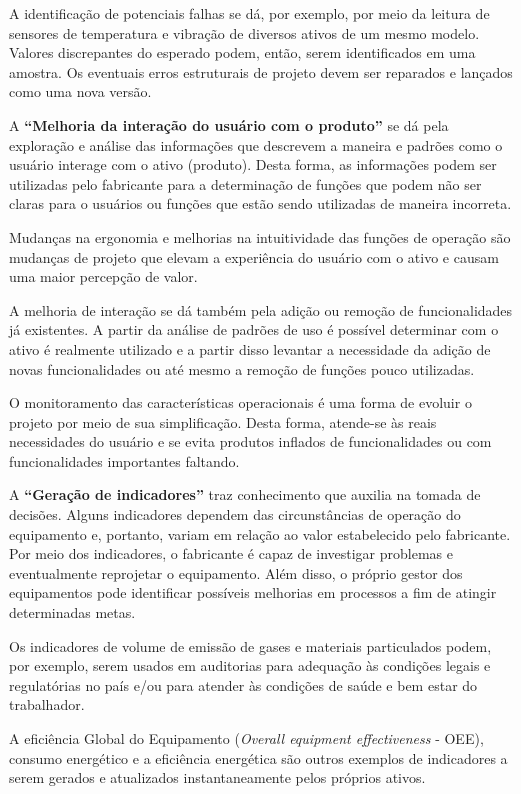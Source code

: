 A identificação de potenciais falhas se dá, por exemplo, por meio da leitura de sensores de temperatura e vibração de diversos ativos de um mesmo modelo. Valores discrepantes do esperado podem, então, serem identificados em uma amostra. Os eventuais erros estruturais de projeto devem ser reparados e lançados como uma nova versão.

A \textbf{``Melhoria da interação do usuário com o produto''} se dá pela exploração e análise das informações que descrevem a maneira e padrões como o usuário interage com o ativo (produto). Desta forma, as informações podem ser utilizadas pelo fabricante para a determinação de funções que podem não ser claras para o usuários ou funções que estão sendo utilizadas de maneira incorreta.

Mudanças na ergonomia e melhorias na intuitividade das funções de operação são mudanças de projeto que elevam a experiência do usuário com o ativo e causam uma maior percepção de valor.

A melhoria de interação se dá também pela adição ou remoção de funcionalidades já existentes. A partir da análise de padrões de uso é possível determinar com o ativo é realmente utilizado e a partir disso levantar a necessidade da adição de novas funcionalidades ou até mesmo a remoção de funções pouco utilizadas.

O monitoramento das características operacionais é uma forma de evoluir o projeto por meio de sua simplificação. Desta forma, atende-se às reais necessidades do usuário e se evita produtos inflados de funcionalidades ou com funcionalidades importantes faltando.

A \textbf{``Geração de indicadores''} traz conhecimento que auxilia na tomada de decisões. Alguns indicadores dependem das circunstâncias de operação do equipamento e, portanto, variam em relação ao valor estabelecido pelo fabricante. Por meio dos indicadores, o fabricante é capaz de investigar problemas e eventualmente reprojetar o equipamento. Além disso, o próprio gestor dos equipamentos pode identificar possíveis melhorias em processos a fim de atingir determinadas metas.

Os indicadores de volume de emissão de gases e materiais particulados podem, por exemplo, serem usados em auditorias para adequação às condições legais e regulatórias no país e/ou para atender às condições de saúde e bem estar do trabalhador.

A eficiência Global do Equipamento (\textit{Overall equipment effectiveness} - OEE), consumo energético e a eficiência energética são outros exemplos de indicadores a serem gerados e atualizados instantaneamente pelos próprios ativos.

